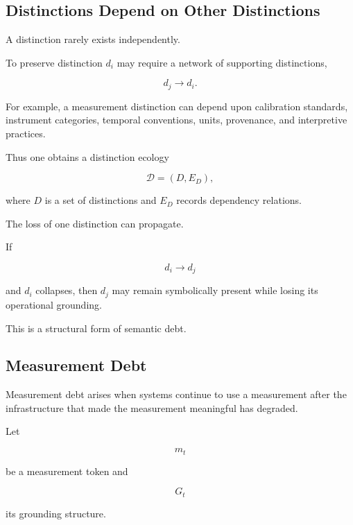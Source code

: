 \documentclass[11pt]{article}
\theoremstyle{remark}
\begin{document}
\subsection{Distinctions Depend on Other Distinctions}

A distinction rarely exists independently.

To preserve distinction $d_i$ may require a network of supporting distinctions,

\begin{equation}
d_j\rightarrow d_i.
\end{equation}

For example, a measurement distinction can depend upon calibration standards, instrument categories, temporal conventions, units, provenance, and interpretive practices.

Thus one obtains a distinction ecology

\begin{equation}
\mathcal{D}
=
(D,E_D),
\end{equation}

where $D$ is a set of distinctions and $E_D$ records dependency relations.

The loss of one distinction can propagate.

If

\begin{equation}
d_i\rightarrow d_j
\end{equation}

and $d_i$ collapses, then $d_j$ may remain symbolically present while losing its operational grounding.

This is a structural form of semantic debt.

\subsection{Measurement Debt}

Measurement debt arises when systems continue to use a measurement after the infrastructure that made the measurement meaningful has degraded.

Let

\begin{equation}
m_t
\end{equation}

be a measurement token and

\begin{equation}
G_t
\end{equation}

its grounding structure.
\end{document}
